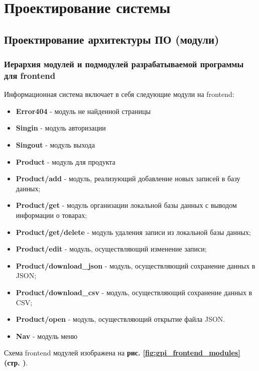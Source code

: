 \newpage

\section{Проектирование системы}

\subsection{Проектирование архитектуры ПО (модули)}

\subsubsection*{Иерархия модулей и подмодулей разрабатываемой программы для frontend}

Информационная система включает в себя следующие модули на frontend:

\begin{itemize}
    \item \textbf{Error404} - модуль не найденной страницы
    \item \textbf{Singin} - модуль авторизации
    \item \textbf{Singout} - модуль выхода
    \item \textbf{Product} - модуль для продукта
    \item \textbf{Product/add} - модуль, реализующий добавление новых записей в базу данных;
    \item \textbf{Product/get} - модуль организации локальной базы данных с выводом информации о товарах;
    \item \textbf{Product/get/delete} - модуль удаления записи из локальной базы данных;
    \item \textbf{Product/edit} - модуль, осуществляющий изменение записи;
    \item \textbf{Product/download\_json} - модуль, осуществляющий сохранение данных в JSON;
    \item \textbf{Product/download\_csv} - модуль, осуществляющий сохранение данных в CSV;
    \item \textbf{Product/open} - модуль, осуществляющий открытие файла JSON.
    \item \textbf{Nav} - модуль меню
\end{itemize}

Схема frontend модулей изображена на
\textbf{рис. \ref{fig:gpi_frontend_modules} (стр. \pageref{fig:gpi_frontend_modules})}.

